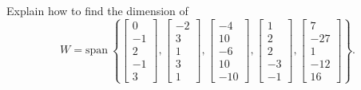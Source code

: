 \documentclass{article}
\begin{document}
\begin{exerciseStatement}
    Explain how to find the dimension of
\[W=\mathrm{span}\ \left\{\left[\begin{array}{r}
0 \\
-1 \\
2 \\
-1 \\
3
\end{array}\right] , \left[\begin{array}{r}
-2 \\
3 \\
1 \\
3 \\
1
\end{array}\right] , \left[\begin{array}{r}
-4 \\
10 \\
-6 \\
10 \\
-10
\end{array}\right] , \left[\begin{array}{r}
1 \\
2 \\
2 \\
-3 \\
-1
\end{array}\right] , \left[\begin{array}{r}
7 \\
-27 \\
1 \\
-12 \\
16
\end{array}\right]\right\}.\]



  
\end{exerciseStatement}
\end{document}
